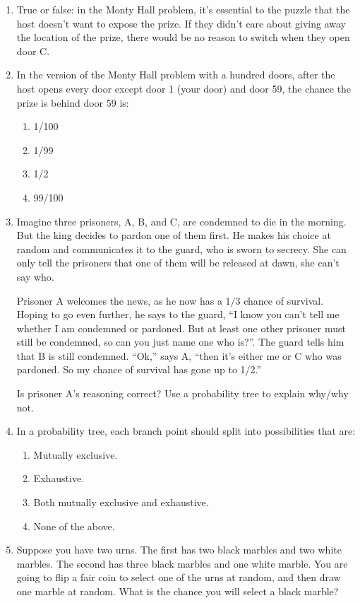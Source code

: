 \documentclass[justified]{tufte-book}
\providecommand{\tightlist}{%
  \setlength{\itemsep}{0pt}\setlength{\parskip}{0pt}}
\theoremstyle{definition}
\theoremstyle{definition}
\theoremstyle{definition}
\theoremstyle{definition}
\theoremstyle{remark}
\begin{document}
\begin{enumerate}
\item
  True or false: in the Monty Hall problem, it's essential to the puzzle that the host doesn't want to expose the prize. If they didn't care about giving away the location of the prize, there would be no reason to switch when they open door C.
\item
  In the version of the Monty Hall problem with a hundred doors, after the host opens every door except door 1 (your door) and door 59, the chance the prize is behind door 59 is:

  \begin{enumerate}
  \def\labelenumii{\alph{enumii}.}
  \tightlist
  \item
    1/100
  \item
    1/99
  \item
    1/2
  \item
    99/100
  \end{enumerate}
\item
  Imagine three prisoners, A, B, and C, are condemned to die in the morning. But the king decides to pardon one of them first. He makes his choice at random and communicates it to the guard, who is sworn to secrecy. She can only tell the prisoners that one of them will be released at dawn, she can't say who.

  Prisoner A welcomes the news, as he now has a \(1/3\) chance of survival. Hoping to go even further, he says to the guard, ``I know you can't tell me whether I am condemned or pardoned. But at least one other prisoner must still be condemned, so can you just name one who is?''. The guard tells him that B is still condemned. ``Ok,'' says A, ``then it's either me or C who was pardoned. So my chance of survival has gone up to 1/2.''

  Is prisoner A's reasoning correct? Use a probability tree to explain why/why not.
\item
  In a probability tree, each branch point should split into possibilities that are:

  \begin{enumerate}
  \def\labelenumii{\alph{enumii}.}
  \tightlist
  \item
    Mutually exclusive.
  \item
    Exhaustive.
  \item
    Both mutually exclusive and exhaustive.
  \item
    None of the above.
  \end{enumerate}
\item
  Suppose you have two urns. The first has two black marbles and two white marbles. The second has three black marbles and one white marble. You are going to flip a fair coin to select one of the urns at random, and then draw one marble at random. What is the chance you will select a black marble?


\end{enumerate}
\end{document}
